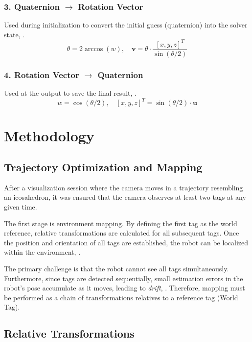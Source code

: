 \subsubsection{3. Quaternion $\to$ Rotation Vector}
Used during initialization to convert the initial guess (quaternion) into the solver state, \cite{diebel2006representing}.
\begin{equation}
    \theta = 2 \arccos(w), \quad \mathbf{v} = \theta \cdot \frac{[x, y, z]^T}{\sin(\theta/2)}
\end{equation}

\subsubsection{4. Rotation Vector $\to$ Quaternion}
Used at the output to save the final result, \cite{diebel2006representing}.
\begin{equation}
    w = \cos(\theta/2), \quad [x, y, z]^T = \sin(\theta/2) \cdot \mathbf{u}
\end{equation}

\section{Methodology}

\subsection{Trajectory Optimization and Mapping}

After a visualization session where the camera moves in a trajectory resembling an icosahedron, it was ensured that the camera observes at least two tags at any given time.

The first stage is environment mapping. By defining the first tag as the world reference, relative transformations are calculated for all subsequent tags. Once the position and orientation of all tags are established, the robot can be localized within the environment, \cite{olson2011apriltag}.

The primary challenge is that the robot cannot see all tags simultaneously. Furthermore, since tags are detected sequentially, small estimation errors in the robot's pose accumulate as it moves, leading to \textit{drift}, \cite{barfoot2024state}. Therefore, mapping must be performed as a chain of transformations relatives to a reference tag (World Tag).

\subsection{Relative Transformations}

